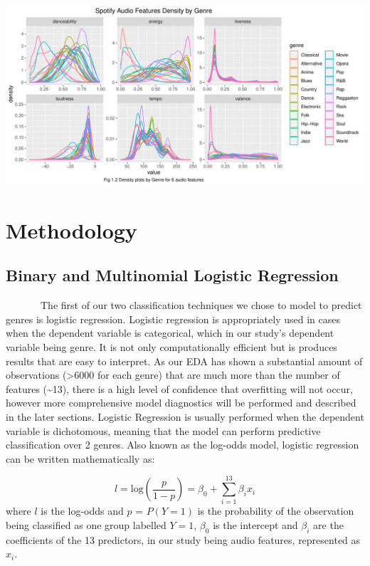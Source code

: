\documentclass[
]{article}
\begin{document}
\includegraphics{write-up_files/figure-latex/unnamed-chunk-5-1.pdf}

\hypertarget{methodology}{%
\section{Methodology}\label{methodology}}

\hypertarget{binary-and-multinomial-logistic-regression}{%
\subsection{Binary and Multinomial Logistic
Regression}\label{binary-and-multinomial-logistic-regression}}

~~~~~~~The first of our two classification techniques we chose to model
to predict genres is logistic regression. Logistic regression is
appropriately used in cases when the dependent variable is categorical,
which in our study's dependent variable being genre. It is not only
computationally efficient but is produces results that are easy to
interpret. As our EDA has shown a substantial amount of observations
(\textgreater6000 for each genre) that are much more than the number of
features (\textasciitilde13), there is a high level of confidence that
overfitting will not occur, however more comprehensive model diagnostics
will be performed and described in the later sections. Logistic
Regression is usually performed when the dependent variable is
dichotomous, meaning that the model can perform predictive
classification over 2 genres. Also known as the log-odds model, logistic
regression can be written mathematically as:

\[
l = \text{log} (\frac{p}{1-p}) = \beta_0 + \sum_{i=1}^{13}\beta_i x_i
\] where \(l\) is the log-odds and \(p\) = \(P(Y=1)\) is the probability
of the observation being classified as one group labelled \(Y=1\),
\(\beta_0\) is the intercept and \(\beta_i\) are the coefficients of the
13 predictors, in our study being audio features, represented as
\(x_i\).
\end{document}
